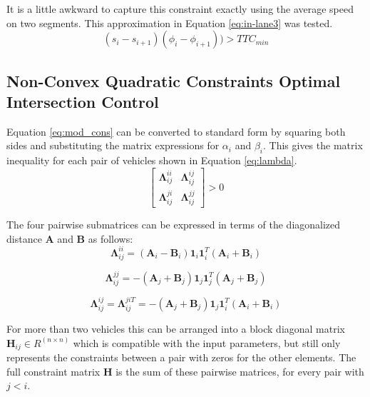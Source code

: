 It is a little awkward to capture this constraint exactly using the average speed on two segments. This approximation in Equation \ref{eq:in-lane3} was tested.
\begin{equation}
(s_{i}-s_{i+1})(\phi_i - \phi_{i+1})) > TTC_{min}
\label{eq:in-lane3}
\end{equation}  
\subsection{Non-Convex Quadratic Constraints Optimal Intersection Control}
\label{sec:quad}
Equation \ref{eq:mod_cons} can be converted to standard form by squaring both sides and substituting the matrix expressions for $\alpha_i$ and $\beta_i$. This gives the matrix inequality for each pair of vehicles shown in Equation \ref{eq:lambda}.
\begin{equation}
[\bm{\phi}_i^T, \bm{\phi}_j^T] \left[\begin{array}{cc}
\bm{\Lambda}_{ij}^{ii} & \bm{\Lambda}_{ij}^{ij} \\
\bm{\Lambda}_{ij}^{ji} & \bm{\Lambda}_{ij}^{jj}
\end{array}\right] > 0
\label{eq:lambda}
\end{equation}

The four pairwise submatrices can be expressed in terms of the diagonalized distance $\bm{A}$ and $\bm{B}$ as follows:
\begin{equation}
\bm{\Lambda}_{ij}^{ii} =  (\bm{A}_i - \bm{B}_i)\bm{1}_i\bm{1}_i^T(\bm{A}_i + \bm{B}_i)
\end{equation}

\begin{equation}
\bm{\Lambda}_{ij}^{jj} =  - (\bm{A}_j + \bm{B}_j)\bm{1}_j\bm{1}_j^T(\bm{A}_j + \bm{B}_j)
\end{equation}

\begin{equation}
\bm{\Lambda}_{ij}^{ij} = \bm{\Lambda}_{ij}^{ji T}  =  - (\bm{A}_j + \bm{B}_j)\bm{1}_j\bm{1}_i^T(\bm{A}_i + \bm{B}_i)
\end{equation}

For more than two vehicles this can be arranged into a
block diagonal matrix $\bm{H}_{ij} \in R^{(n \times n)}$ which is compatible with the input parameters, but still only represents the constraints between a pair with zeros for the other elements. The full constraint matrix $\bm{H}$ is the sum of these pairwise matrices, for every pair with $j<i$. 










